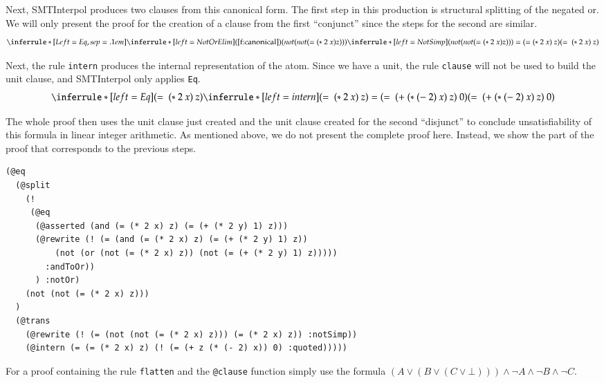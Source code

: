 \documentclass[a4paper]{article}
\newcommand\si{SMTInterpol\xspace}
\begin{document}
Next, \si produces two clauses from this canonical form.  The first step in
this production is structural splitting of the negated or.  We will only
present the proof for the creation of a clause from the first ``conjunct''
since the steps for the second are similar.
\[
\inferrule*[Left=Eq,sep=.1em]{
  \inferrule*[left=NotOrElim]{(\ref{f:canonical})}{(not (not (= (*\ 2\ x) z)))}\\
  \inferrule*[left=NotSimp]{ }{(not (not (= (*\ 2\ x) z))) =
    (= (*\ 2\ x)\ z)}}
           {(=\ (*\ 2\ x)\ z)}
\]

Next, the rule \texttt{intern} produces the internal representation of the
atom.  Since we have a unit, the rule \texttt{clause} will not be used to
build the unit clause, and \si only applies \texttt{Eq}.
\[
\inferrule*[left=Eq]{(=\ (*\ 2\ x)\ z) \\
  \inferrule*[left=intern]{ }{(=\ (*\ 2\ x)\ z) = (=\ (+\ (*\ (-\ 2)\ x)\ z)\ 
    0)}}
           {(=\ (+\ (*\ (-\ 2)\ x)\ z)\ 0)}
\]

The whole proof then uses the unit clause just created and the unit clause
created for the second ``disjunct'' to conclude unsatisfiability of this
formula in linear integer arithmetic.  As mentioned above, we do not present
the complete proof here.  Instead, we show the part of the proof that
corresponds to the previous steps.
\begin{verbatim}
(@eq
  (@split
    (! 
     (@eq
      (@asserted (and (= (* 2 x) z) (= (+ (* 2 y) 1) z)))
      (@rewrite (! (= (and (= (* 2 x) z) (= (+ (* 2 y) 1) z))
          (not (or (not (= (* 2 x) z)) (not (= (+ (* 2 y) 1) z)))))
        :andToOr))
      ) :notOr)
    (not (not (= (* 2 x) z)))
  )
  (@trans
    (@rewrite (! (= (not (not (= (* 2 x) z))) (= (* 2 x) z)) :notSimp))
    (@intern (= (= (* 2 x) z) (! (= (+ z (* (- 2) x)) 0) :quoted)))))
\end{verbatim}

For a proof containing the rule \verb:flatten: and the \verb:@clause: function
simply use the formula $(A\lor(B\lor(C\lor\bot)))\land\lnot A\land\lnot
B\land\lnot C$.
\end{document}
